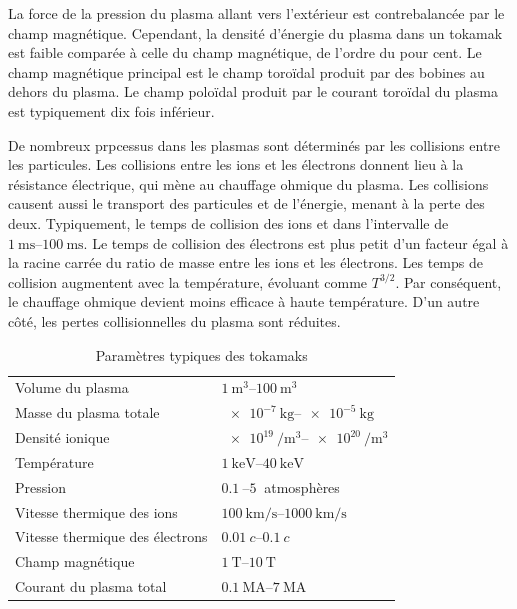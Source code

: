 \documentclass[main.tex]{subfiles}
\begin{document}
La force de la pression du plasma allant vers l'extérieur est contrebalancée par le champ magnétique.
Cependant, la densité d'énergie du plasma dans un tokamak est faible comparée à celle du champ magnétique, de l'ordre du pour cent.
Le champ magnétique principal est le champ toroïdal produit par des bobines au dehors du plasma.
Le champ poloïdal produit par le courant toroïdal du plasma  est typiquement dix fois inférieur.

De nombreux prpcessus dans les plasmas sont déterminés par les collisions entre les particules.
Les collisions entre les ions et les électrons donnent lieu à la résistance électrique, qui mène au chauffage ohmique du plasma.
Les collisions causent aussi le transport des particules et de l'énergie, menant à la perte des deux.
Typiquement, le temps de collision des ions et dans l'intervalle de \( \qtyrange[range-units=single,range-phrase=-]{1}{100}{\milli\second} \).
Le temps de collision des électrons est plus petit d'un facteur égal à la racine carrée du ratio de masse entre les ions et les électrons.
Les temps de collision augmentent avec la température, évoluant comme \( T^{3/2} \).
Par conséquent, le chauffage ohmique devient moins efficace à haute température.
D'un autre côté, les pertes collisionnelles du plasma sont réduites.

\begin{table}
	\centering
	\caption{Paramètres typiques des tokamaks}
	\begin{tabular}{l l}
		\hline
		Volume du plasma & \( \qtyrange[range-units=single,range-phrase=-]{1}{100}{\meter\cubed} \)\\
		Masse du plasma totale & \( \qtyrange[range-units=single,range-phrase=-]{e-7}{e-5}{\kilogram} \)\\
		Densité ionique & \( \qtyrange[range-units=single,range-phrase=-]{e19}{e20}{\per\meter\cubed} \)\\
		Température & \( \qtyrange[range-units=single,range-phrase=-]{1}{40}{\kilo\electronvolt} \)\\
		Pression & \( \qtyrange[range-units=single,range-phrase=-]{0.1}{5}{} \) atmosphères\\
		Vitesse thermique des ions & \( \qtyrange[range-units=single,range-phrase=-]{100}{1000}{\kilo\meter\per\second} \)\\
		Vitesse thermique des électrons & \( \qtyrange[range-units=single,range-phrase=-]{0.01}{0.1}{c} \)\\
		Champ magnétique & \( \qtyrange[range-units=single,range-phrase=-]{1}{10}{\tesla} \)\\
		Courant du plasma total & \( \qtyrange[range-units=single,range-phrase=-]{0.1}{7}{\mega\ampere} \)\\
		\hline 
	\end{tabular}
	\label{table:plasma_parametre}
\end{table}
\end{document}
